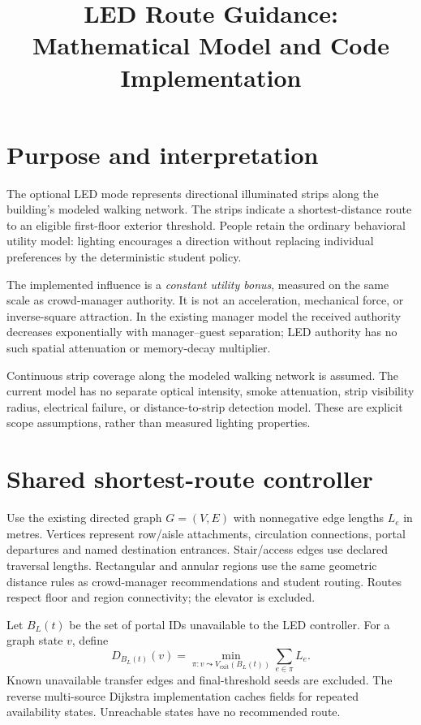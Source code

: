 \documentclass[11pt]{article}
\title{LED Route Guidance: Mathematical Model and Code Implementation}
\author{}
\date{}
\begin{document}
\maketitle

\section{Purpose and interpretation}
The optional LED mode represents directional illuminated strips along the
building's modeled walking network. The strips indicate a shortest-distance
route to an eligible first-floor exterior threshold. People retain the ordinary
behavioral utility model: lighting encourages a direction without replacing
individual preferences by the deterministic student policy.

The implemented influence is a \emph{constant utility bonus}, measured on the
same scale as crowd-manager authority. It is not an acceleration, mechanical
force, or inverse-square attraction. In the existing manager model the
received authority decreases exponentially with manager--guest separation;
LED authority has no such spatial attenuation or memory-decay multiplier.

Continuous strip coverage along the modeled walking network is assumed. The
current model has no separate optical intensity, smoke attenuation, strip
visibility radius, electrical failure, or distance-to-strip detection model.
These are explicit scope assumptions, rather than measured lighting properties.

\section{Shared shortest-route controller}
Use the existing directed graph $G=(V,E)$ with nonnegative edge lengths
$L_e$ in metres. Vertices represent row/aisle attachments, circulation
connections, portal departures and named destination entrances. Stair/access
edges use declared traversal lengths. Rectangular and annular regions use the
same geometric distance rules as crowd-manager recommendations and student
routing. Routes respect floor and region connectivity; the elevator is excluded.

Let $B_L(t)$ be the set of portal IDs unavailable to the LED controller.
For a graph state $v$, define
\[
 D_{B_L(t)}(v)=\min_{\pi:v\leadsto V_{\mathrm{exit}}(B_L(t))}
                                  \sum_{e\in\pi}L_e.
\]
Known unavailable transfer edges and final-threshold seeds are excluded.
The reverse multi-source Dijkstra implementation caches fields for repeated
availability states. Unreachable states have no recommended route.
\end{document}
